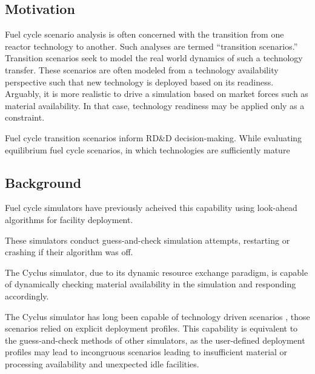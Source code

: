

\subsection{Motivation}
Fuel cycle scenario analysis is often concerned with the transition from one 
reactor technology to another. Such analyses are termed ``transition 
scenarios.''  Transition scenarios seek to model the real world dynamics of 
such a technology transfer. These scenarios are often modeled from a technology 
availability perspective such that new technology is deployed based on its 
readiness.  Arguably, it is more realistic to drive a simulation based on 
market forces such as material availability. In that case, technology readiness 
may be applied only as a constraint. 



Fuel cycle transition scenarios inform RD\&D decision-making. While evaluating equilibrium fuel cycle scenarios, in which technologies are sufficiently mature

\subsection{Background}

Fuel cycle simulators have previously acheived this capability using look-ahead
algorithms for facility deployment. 

These simulators conduct guess-and-check simulation attempts, restarting or
crashing if their algorithm was off.

The Cyclus simulator, due to its dynamic resource exchange paradigm, is capable
of dynamically checking material availability in the simulation and responding
accordingly. 


The Cyclus simulator has long been capable of technology driven scenarios
\cite{gidden_cyclus_2012}, those scenarios relied on explicit deployment
profiles. This capability is equivalent to the guess-and-check methods of other
simulators, as the user-defined deployment profiles may lead to incongruous
scenarios leading to insufficient material or processing availability and
unexpected idle facilities.  

